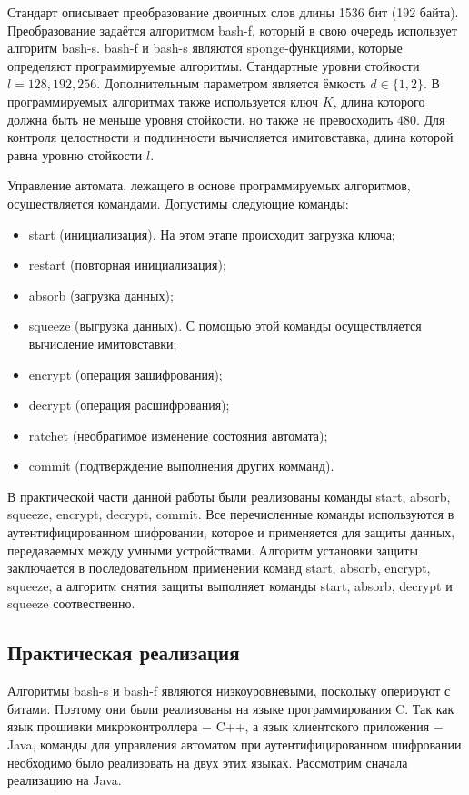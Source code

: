 	Стандарт описывает преобразование двоичных слов длины 1536 бит (192 байта). Преобразование
	задаётся алгоритмом bash-f, который в свою очередь использует алгоритм bash-s. bash-f и bash-s
	являются sponge-функциями, которые определяют программируемые алгоритмы. Стандартные уровни
	стойкости $l = 128, 192, 256$. Дополнительным параметром является ёмкость $d \in \{1, 2\}$.
	В программируемых алгоритмах также используется ключ $K$, длина которого должна быть не меньше 
	уровня стойкости, но также не превосходить 480. Для контроля целостности и подлинности вычисляется
	имитовставка, длина которой равна уровню стойкости $l$.
	
	Управление автомата, лежащего в основе программируемых алгоритмов, осуществляется командами.
	Допустимы следующие команды:
	
	\begin{itemize}
		\item start (инициализация). На этом этапе происходит загрузка ключа;
		\item restart (повторная инициализация);
		\item absorb (загрузка данных);
		\item squeeze (выгрузка данных). С помощью этой команды осуществляется вычисление имитовставки;
		\item encrypt (операция зашифрования);
		\item decrypt (операция расшифрования);
		\item ratchet (необратимое изменение состояния автомата);
		\item commit (подтверждение выполнения других комманд).
	\end{itemize}

	В практической части данной работы были реализованы команды start, absorb, squeeze, encrypt, 
	decrypt, commit. Все перечисленные команды используются в аутентифицированном шифровании,
	которое и применяется для защиты данных, передаваемых между умными устройствами. Алгоритм
	установки защиты заключается в последовательном применении команд start, absorb, encrypt, squeeze,
	а алгоритм снятия защиты выполняет команды start, absorb, decrypt и squeeze соотвественно.
	
	\subsection{Практическая реализация}
	
	Алгоритмы bash-s и bash-f являются низкоуровневыми, поскольку оперируют с битами. Поэтому они 
	были реализованы на языке программирования C. Так как язык прошивки микроконтроллера $-$ C++,
	а язык клиентского приложения $-$ Java, команды для управления автоматом при аутентифицированном 
	шифровании необходимо было реализовать на двух этих языках. Рассмотрим сначала реализацию на Java.
	
